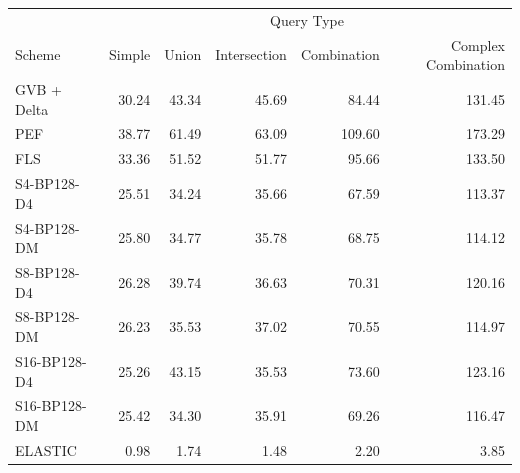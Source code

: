 \begin{tabular}{lrrrrr}
\toprule
 & \multicolumn{5}{c}{Query Type} \\
Scheme & Simple & Union & Intersection & Combination & Complex Combination \\
\midrule
GVB + Delta & 30.24 & 43.34 & 45.69 & 84.44 & 131.45 \\
PEF & 38.77 & 61.49 & 63.09 & 109.60 & 173.29 \\
FLS & 33.36 & 51.52 & 51.77 & 95.66 & 133.50 \\
S4-BP128-D4 & 25.51 & 34.24 & 35.66 & 67.59 & 113.37 \\
S4-BP128-DM & 25.80 & 34.77 & 35.78 & 68.75 & 114.12 \\
S8-BP128-D4 & 26.28 & 39.74 & 36.63 & 70.31 & 120.16 \\
S8-BP128-DM & 26.23 & 35.53 & 37.02 & 70.55 & 114.97 \\
S16-BP128-D4 & 25.26 & 43.15 & 35.53 & 73.60 & 123.16 \\
S16-BP128-DM & 25.42 & 34.30 & 35.91 & 69.26 & 116.47 \\
ELASTIC & 0.98 & 1.74 & 1.48 & 2.20 & 3.85 \\
\bottomrule
\end{tabular}
